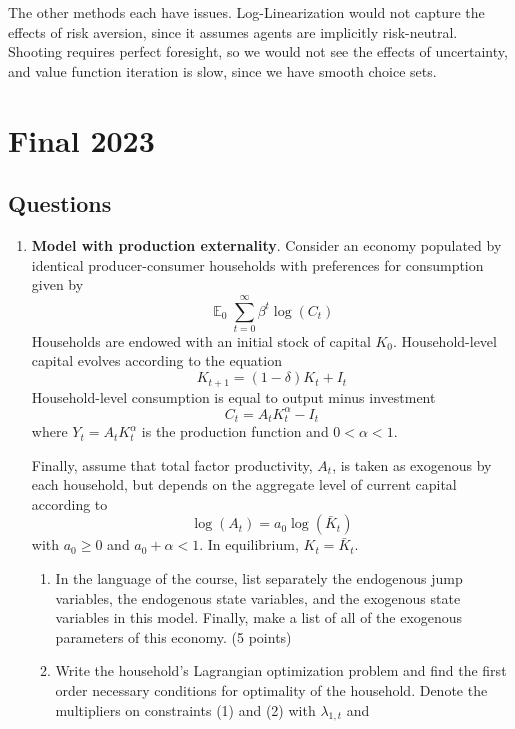 \documentclass[10pt]{article}
\newcommand{\expect}{\mathop{\mathbb{E}}} %
\theoremstyle{plain}
\theoremstyle{definition}
\begin{document}
\begin{enumerate}
	The other methods each have issues. Log-Linearization would not capture the effects of risk aversion, since it assumes agents are implicitly risk-neutral. Shooting requires perfect foresight, so we would not see the effects of uncertainty, and value function iteration is slow, since we have smooth choice sets.
\end{enumerate}


\newpage
\section{Final 2023}

\subsection{Questions}

\begin{enumerate}
	\item \textbf{Model with production externality}. Consider an economy populated by identical producer-consumer households with preferences for consumption given by
	\[
	\expect_0 \sum_{t=0}^\infty \beta^t \log(C_t)
	\]
	Households are endowed with an initial stock of capital $K_0$. Household-level capital evolves according to the equation
	\[
	K_{t+1} = (1-\delta) K_t + I_t
	\]
	Household-level consumption is equal to output minus investment
	\[
	C_t = A_tK_t^\alpha - I_t
	\]
	where $Y_t = A_tK_t^{\alpha}$ is the production function and $0 < \alpha < 1$.
	
	Finally, assume that total factor productivity, $A_t$, is taken as exogenous by each household, but depends on the aggregate level of current capital according to
	\[
	\log(A_t) = a_0 \log(\bar{K}_t)
	\]
	with $a_0 \ge 0$ and $a_0 + \alpha < 1$. In equilibrium, $K_t = \bar{K}_t$.
	\begin{enumerate}
		\item In the language of the course, list separately the endogenous jump variables, the endogenous state variables, and the exogenous state variables in this model. Finally, make a list of all of the exogenous parameters of this economy. (5 points)
		\item Write the household’s Lagrangian optimization problem and find the first order necessary conditions for optimality of the household. Denote the multipliers on constraints (1) and (2) with $\lambda_{1,t}$ and 
	\end{enumerate}
\end{enumerate}
\end{document}
